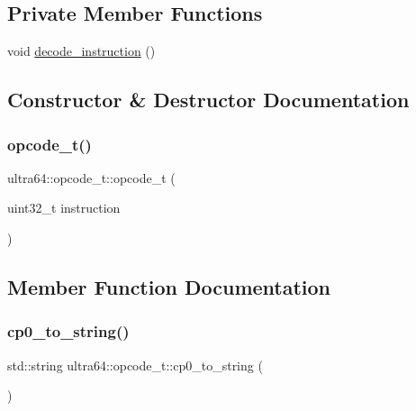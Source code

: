 \subsection*{Private Member Functions}
\begin{DoxyCompactItemize}
\item 
void \hyperlink{classultra64_1_1opcode__t_ab7808f75bd2f61bf3c9da510fe274ad8}{decode\+\_\+instruction} ()
\end{DoxyCompactItemize}


\subsection{Constructor \& Destructor Documentation}
\mbox{\label{classultra64_1_1opcode__t_a3869610ce2c9c9c22f2ed0731c9992bc}} 
\subsubsection{\texorpdfstring{opcode\+\_\+t()}{opcode\_t()}}
{\footnotesize\ttfamily ultra64\+::opcode\+\_\+t\+::opcode\+\_\+t (\begin{DoxyParamCaption}\item[{uint32\+\_\+t}]{instruction }\end{DoxyParamCaption})}



\subsection{Member Function Documentation}
\mbox{\label{classultra64_1_1opcode__t_a4d00c4cdb1b33b3a4afbc0d4eaeedcaf}} 
\subsubsection{\texorpdfstring{cp0\+\_\+to\+\_\+string()}{cp0\_to\_string()}}
{\footnotesize\ttfamily std\+::string ultra64\+::opcode\+\_\+t\+::cp0\+\_\+to\+\_\+string (\begin{DoxyParamCaption}{ }\end{DoxyParamCaption})}

